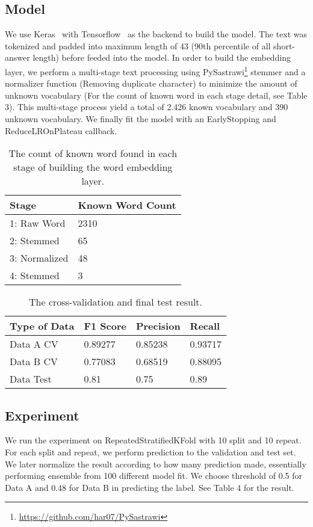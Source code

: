 \documentclass[11pt,a4paper]{article}
\begin{document}
\subsection{Model}
We use Keras~\cite{Keras} with Tensorflow~\cite{Tensorflow} as the backend to build the model. The text was tokenized and padded into maximum length of 43 (90th percentile of all short-answer length) before feeded into the model. In order to build the embedding layer, we perform a multi-stage text processing using PySastrawi\footnote{\url{https://github.com/har07/PySastrawi}} stemmer and a normalizer function (Removing duplicate character) to minimize the amount of unknown vocabulary (For the count of known word in each stage detail, see Table 3). This multi-stage process yield a total of 2.426 known vocabulary and 390 unknown vocabulary. We finally fit the model with an EarlyStopping and ReduceLROnPlateau callback.

\begin{table}
\centering
\small
\begin{tabular}{|l|l|}
\hline
\textbf{Stage} & \textbf{Known Word Count}\\\hline
{1: Raw Word} & {2310}\\ 
{2: Stemmed} & {65}\\
{3: Normalized} & {48}\\ 
{4: Stemmed} & {3}\\\hline
\end{tabular} 
\caption{The count of known word found in each stage of building the word embedding layer.}
\end{table}

\begin{table}
\centering
\small
\begin{tabular}{|l|l|l|l|}
\hline
\textbf{Type of Data} & \textbf{F1 Score} & \textbf{Precision} & \textbf{Recall}\\\hline
{Data A CV} & {0.89277} & {0.85238} & {0.93717}\\ 
{Data B CV} & {0.77083} & {0.68519} & {0.88095}\\
{Data Test} & {0.81} & {0.75} & {0.89}\\ \hline
\end{tabular} 
\caption{The cross-validation and final test result.}
\end{table}

\subsection{Experiment}
We run the experiment on RepeatedStratifiedKFold with 10 split and 10 repeat. For each split and repeat, we perform prediction to the validation and test set. We later normalize the result according to how many prediction made, essentially performing ensemble from 100 different model fit. We choose threshold of 0.5 for Data A and 0.48 for Data B in predicting the label. See Table 4 for the result.
\end{document}
